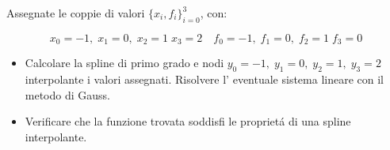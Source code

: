 Assegnate le coppie di valori $\{x_i,f_i \}_{i=0}^3$, con:

$$x_0=-1, \; x_1=0, \; x_2=1  \; x_3=2 \quad f_0=-1, \; f_1=0, \; f_2=1  \; f_3=0$$

\begin{itemize}
\item Calcolare la spline di primo grado e nodi
$y_0=-1, \; y_1=0, \;y_2=1, \; y_3=2$ interpolante i valori
assegnati. Risolvere l' eventuale sistema lineare con il metodo di
Gauss.
\item Verificare che la funzione trovata soddisfi le propriet\'a
di una spline interpolante.

\end{itemize}
